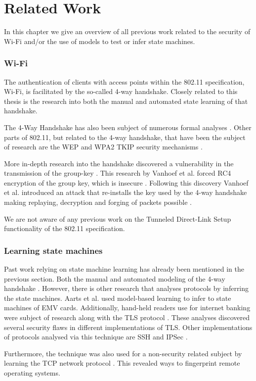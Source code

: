 \chapter{Related Work}\label{relatedwork}

In this chapter we give an overview of all previous work related to the security of Wi-Fi and/or the use of models to test or infer state machines.

\subsection{Wi-Fi}

The authentication of clients with access points within the 802.11 specification, Wi-Fi, is facilitated by the so-called 4-way handshake. Closely related to this thesis is the research into both the manual \cite{Vanhoef:2017} and automated \cite{Stone:2018} state learning of that handshake.

The 4-Way Handshake has also been subject of numerous formal analyses \cite{He:2004,Dong:2009,Xing:2008,He:2005}. Other parts of 802.11, but related to the 4-way handshake, that have been the subject of research are the WEP and WPA2 TKIP security mechanisms \cite{Fluhrer:2001,Vanhoef:2013}.

More in-depth research into the handshake discovered a vulnerability in the transmission of the group-key \cite{Vanhoef:2016}. This research by Vanhoef et al. forced RC4 encryption of the group key, which is insecure \cite{Fluhrer:2001}. Following this discovery Vanhoef et al. introduced an attack that re-installs the key used by the 4-way handshake making replaying, decryption and forging of packets possible \cite{Vanhoef:2017-2}.

We are not aware of any previous work on the Tunneled Direct-Link Setup functionality of the 802.11 specification.

\subsection{Learning state machines}

Past work relying on state machine learning has already been mentioned in the previous section. Both the manual and automated modeling of the 4-way handshake \cite{Vanhoef:2017,Stone:2018}. However, there is other research that analyses protocols by inferring the state machines. Aarts et al. \cite{Aarts:2013} used model-based learning to infer to state machines of EMV cards. Additionally, hand-held readers use for internet banking were subject of research \cite{Chalupar:2014} along with the TLS protocol \cite{Ruiter:2015,Thoor:2018}. These analyses discovered several security flaws in different implementations of TLS. Other implementations of protocols analysed via this technique are SSH \cite{Brostean:2017,Tijssen:2015} and IPSec \cite{Veldhuizen:2017}.

Furthermore, the technique was also used for a non-security related subject by learning the TCP network protocol \cite{Brostean:2014}. This revealed ways to fingerprint remote operating systems.